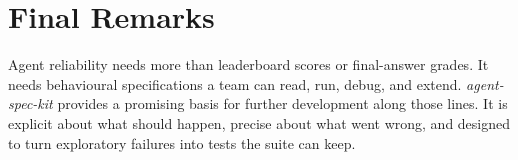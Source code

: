 \section{Final Remarks}

Agent reliability needs more than leaderboard scores or final-answer grades. It needs behavioural specifications a team can read, run, debug, and extend. \emph{agent-spec-kit} provides a promising basis for further development along those lines. It is explicit about what should happen, precise about what went wrong, and designed to turn exploratory failures into tests the suite can keep.
